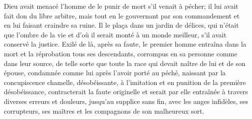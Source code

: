 Dieu avait menacé l’homme de le punir de mort s’il venait à pécher;
il lui avait fait don du libre arbitre,
	mais tout en le gouvernant par son commandement
	et en lui faisant craindre sa ruine.
Il le plaça dans un jardin de délices, qui n’était que l’ombre de la vie
	et d’où il serait monté à un monde meilleur,
	s’il avait conservé la justice.
Exilé de là, après sa faute,
	le premier homme entraîna dans la mort et la réprobation
		tous ses descendants,
	corrompus en sa personne comme dans leur source,
	de telle sorte que toute la race qui devait naître de lui et de son épouse,
	condamnée comme lui après l’avoir porté au péché,
	naissant par la concupiscence chamelle,
	désobéissante, à l’imitation et en punition de la première désobéissance,
	contracterait la faute originelle
	et serait par elle entraînée à travers diverses erreurs et douleurs,
	jusqu’au supplice sans fin, avec les anges infidèles, ses corrupteurs,
	ses maîtres et les compagnons de son malheureux sort.
